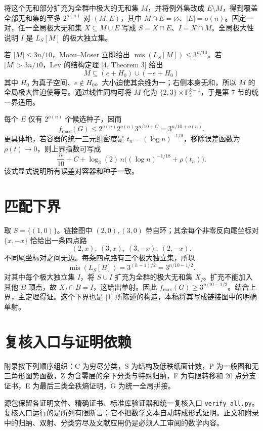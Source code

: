 \documentclass[11pt]{ctexart}
\begin{document}
将这个无和部分扩充为全群中极大的无和集 \(M\)，并将例外集改成 \(E\setminus M\)，得到覆盖全部无和集的至多 \(2^{o(n)}\) 对 \((M,E)\)，其中 \(M\cap E=\varnothing\)、\(|E|=o(n)\)。固定一对，任一全局极大无和集 \(X\subseteq M\cup E\) 写成 \(S=X\cap E\)、\(I=X\cap M\)。全局极大性说明 \(I\) 是 \(L_S[M]\) 的极大独立集。

若 \(|M|\le3n/10\)，Moon--Moser 立即给出 \(\operatorname{mis}(L_S[M])\le3^{n/10}\)。若 \(|M|>3n/10\)，Lev 的结构定理 [4, Theorem 3] 给出
\[
 M\subseteq(e+H_0)\cup(-e+H_0)
\]
其中 \(H_0\) 为真子空间、\(e\notin H_0\)。大小迫使其余维为一；右侧本身无和，所以 \(M\) 的全局极大性迫使等号。通过线性同构可将 \(M\) 化为 \(\{2,3\}\times\mathbb F_5^{k-1}\)，于是第 7 节的统一界适用。

每个 \(E\) 仅有 \(2^{o(n)}\) 个候选种子，因而
\[
 f_{\max}(G)\le2^{o(n)}2^{o(n)}3^{n/10+C}
 =3^{n/10+o(n)}.
\]
更具体地，若容器的统一三元组密度是 \(t_n=(\log n)^{-1/9}\)，移除误差函数为 \(\rho(t)\to0\)，则上界指数可写成
\[
 \frac n{10}+C+\log_3(2)\,n
 \bigl((\log n)^{-1/18}+\rho(t_n)\bigr).
\]
该式显式说明所有误差对容器和种子一致。

\section{匹配下界}

取 \(S=\{(1,0)\}\)。链接图中 \((2,0),(3,0)\) 带自环；其余每个非零反向尾坐标对 \(\{x,-x\}\) 恰给出一条四点路
\[
 (2,x),\ (3,x),\ (3,-x),\ (2,-x).
\]
不同尾坐标对之间无边。每条四点路有三个极大独立集，所以
\[
 \operatorname{mis}(L_S[B])=3^{(h-1)/2}=3^{n/10-1/2}.
\]
对其中每个极大独立集 \(I\)，将 \(S\cup I\) 扩充为全群的极大无和集 \(X_I\)。扩充不能加入其他 \(B\) 顶点，故 \(X_I\cap B=I\)，这给出单射。因此 \(f_{\max}(G)\ge3^{n/10-1/2}\)。结合上界，主定理得证。这个下界也是 [1] 所陈述的构造，本稿将其写成链接图中的明确单射。

\section{复核入口与证明依赖}

附录按下列顺序组织：C 为穷尽分类，S 为结构及低秩纸面计数，P 为一般图和无三角形图势函数，Z 为含零层的余下分类与特殊归纳，F 为有限转移和 20 点分支证书，E 为最后三类全秩熵证明，G 为统一全局拼接。

源包保留各证明文件、精确证书、标准库验证器和统一复核入口 \texttt{verify\_all.py}。复核入口运行的是所列有限断言；它不把数学文本自动转成形式证明。正文和附录中的归纳、双射、分类穷尽及文献应用仍是必须人工审阅的数学内容。
\end{document}
